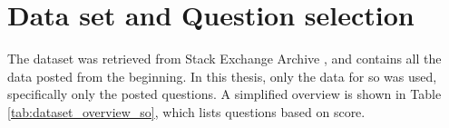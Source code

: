 \label{chap:chapter5}


\section{Data set and Question selection}
\label{sec:data_and_testing}
The dataset was retrieved from Stack Exchange Archive \cite{StackExchange2016}, and contains all the data posted from the beginning. 
In this thesis, only the data for \gls{so} was used, specifically only the posted questions.
A simplified overview is shown in Table \ref{tab:dataset_overview_so}, which lists questions based on score. 

